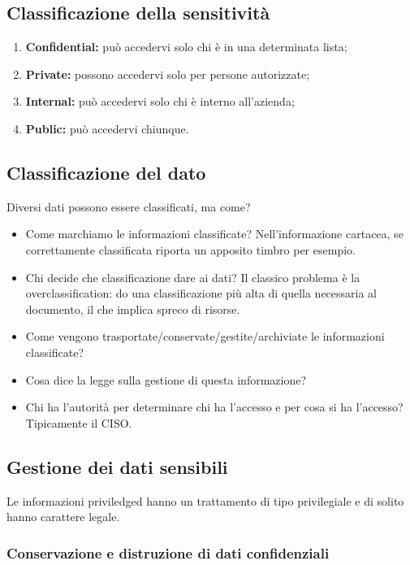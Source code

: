 \subsection{Classificazione della sensitività}

\begin{enumerate}
\item \textbf{Confidential:} può accedervi solo chi è in una determinata lista;
\item \textbf{Private:} possono accedervi solo per persone autorizzate;
\item \textbf{Internal:} può accedervi solo chi è interno all'azienda;
\item \textbf{Public:} può accedervi chiunque.
\end{enumerate}


\subsection{Classificazione del dato}

Diversi dati possono essere classificati, ma come?

\begin{itemize}
\item Come marchiamo le informazioni classificate? Nell'informazione cartacea,
se correttamente classificata riporta un apposito timbro per esempio.
\item Chi decide che classificazione dare ai dati? Il classico problema è la
overclassification: do una classificazione più alta di quella necessaria al
documento, il che implica spreco di risorse.
\item Come vengono trasportate/conservate/gestite/archiviate le informazioni
classificate?
\item Cosa dice la legge sulla gestione di questa informazione?
\item Chi ha l'autorità per determinare chi ha l'accesso e per cosa si ha
l'accesso? Tipicamente il CISO.
\end{itemize}

\subsection{Gestione dei dati sensibili}

Le informazioni priviledged hanno un trattamento di tipo privilegiale e di
solito hanno carattere legale.

\subsubsection{Conservazione e distruzione di dati confidenziali}

